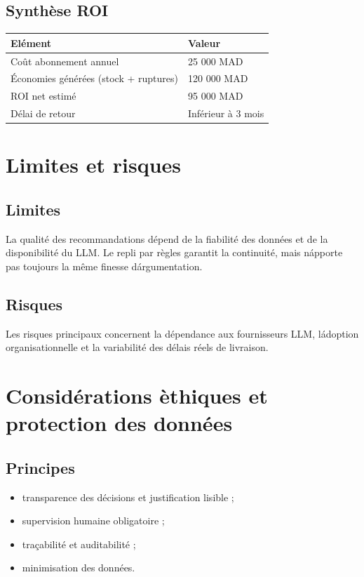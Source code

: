 \documentclass[12pt,a4paper]{report}
\begin{document}
\section{Synth\`ese ROI}
\begin{longtable}{p{6cm} p{6cm}}
\toprule
El\'ement & Valeur \\
\midrule
Co\^ut abonnement annuel & 25 000 MAD \\
\'Economies g\'en\'er\'ees (stock + ruptures) & 120 000 MAD \\
ROI net estim\'e & 95 000 MAD \\
D\'elai de retour & Inf\'erieur \`a 3 mois \\
\bottomrule
\end{longtable}

\cleardoublepage

\chapter{Limites et risques}
\section{Limites}
La qualit\'e des recommandations d\'epend de la fiabilit\'e des donn\'ees et de la disponibilit\'e du LLM. Le repli par r\`egles garantit la continuit\'e, mais n\'apporte pas toujours la m\^eme finesse d\'argumentation.

\section{Risques}
Les risques principaux concernent la d\'ependance aux fournisseurs LLM, l\'adoption organisationnelle et la variabilit\'e des d\'elais r\'eels de livraison.

\cleardoublepage

\chapter{Consid\'erations \`ethiques et protection des donn\'ees}
\section{Principes}
\begin{itemize}
  \item transparence des d\'ecisions et justification lisible ;
  \item supervision humaine obligatoire ;
  \item tra\c{c}abilit\'e et auditabilit\'e ;
  \item minimisation des donn\'ees.
\end{itemize}
\end{document}
